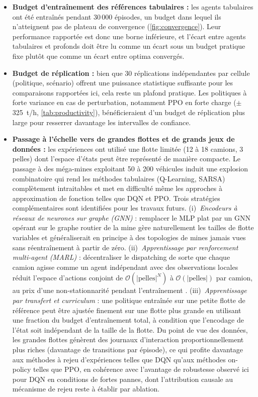 \documentclass[11pt,a4paper]{article}
\begin{document}
\begin{itemize}
  \item \textbf{Budget d'entraînement des références tabulaires :} les agents tabulaires ont été entraînés pendant 30\,000 épisodes, un budget dans lequel ils n'atteignent pas de plateau de convergence (\cref{fig:convergence}). Leur performance rapportée est donc une borne inférieure, et l'écart entre agents tabulaires et profonds doit être lu comme un écart sous un budget pratique fixe plutôt que comme un écart entre optima convergés.
  \item \textbf{Budget de réplication :} bien que 30 réplications indépendantes par cellule (politique, scénario) offrent une puissance statistique suffisante pour les comparaisons rapportées ici, cela reste un plafond pratique. Les politiques à forte variance en cas de perturbation, notamment PPO en forte charge ($\pm$325~t/h, \cref{tab:productivity}), bénéficieraient d'un budget de réplication plus large pour resserrer davantage les intervalles de confiance.
  \item \textbf{Passage à l'échelle vers de grandes flottes et de grands jeux de données :} les expériences ont utilisé une flotte limitée (12 à 18 camions, 3 pelles) dont l'espace d'états peut être représenté de manière compacte. Le passage à des méga-mines exploitant 50 à 200 véhicules induit une explosion combinatoire qui rend les méthodes tabulaires (Q-Learning, SARSA) complètement intraitables et met en difficulté même les approches à approximation de fonction telles que DQN et PPO. Trois stratégies complémentaires sont identifiées pour les travaux futurs. (i)~\textit{Encodeurs à réseaux de neurones sur graphe (GNN)} : remplacer le MLP plat par un GNN opérant sur le graphe routier de la mine gère naturellement les tailles de flotte variables et généraliserait en principe à des topologies de mines jamais vues sans réentraînement à partir de zéro. (ii)~\textit{Apprentissage par renforcement multi-agent (MARL)} : décentraliser le dispatching de sorte que chaque camion agisse comme un agent indépendant avec des observations locales réduit l'espace d'actions conjoint de $\mathcal{O}(|\text{pelles}|^{N})$ à $\mathcal{O}(|\text{pelles}|)$ par camion, au prix d'une non-stationnarité pendant l'entraînement \cite{Zhao2025}. (iii)~\textit{Apprentissage par transfert et curriculum} : une politique entraînée sur une petite flotte de référence peut être ajustée finement sur une flotte plus grande en utilisant une fraction du budget d'entraînement total, à condition que l'encodage de l'état soit indépendant de la taille de la flotte. Du point de vue des données, les grandes flottes génèrent des journaux d'interaction proportionnellement plus riches (davantage de transitions par épisode), ce qui profite davantage aux méthodes à rejeu d'expériences telles que DQN qu'aux méthodes on-policy telles que PPO, en cohérence avec l'avantage de robustesse observé ici pour DQN en conditions de fortes pannes, dont l'attribution causale au mécanisme de rejeu reste à établir par ablation.
\end{itemize}
\end{document}
